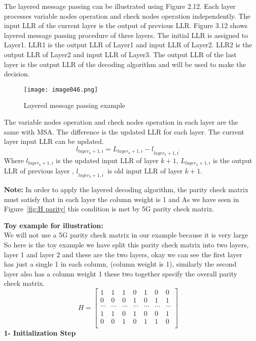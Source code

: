 The layered message passing can be illustrated using Figure 2.12. Each layer processes variable nodes operation and check nodes operation independently. The input LLR of the current layer is the output of previous LLR. Figure 3.12 shows layered message passing procedure of three layers. The initial LLR is assigned to Layer1. LLR1 is the output LLR of Layer1 and input LLR of Layer2. LLR2 is the output LLR of Layer2 and input LLR of Layer3. The output LLR of the last layer is the output LLR of the decoding algorithm and will be used to make the decision.
\begin{figure}[ht]
    \centering
    \texttt{[image: image046.png]}
    \caption{Layered message passing example}
    \label{fig:Layered message passing example }
\end{figure}
The variable nodes operation and check nodes operation in each layer are the same with  MSA. The diﬀerence is the updated LLR for each layer. The current layer input LLR can be updated.
\[ l_{layer_k+1,i}=L_{layer_k+1,i}-l_{layer_k+1,i^\prime} \]
Where $l_{layer_k+1,i}$ is the updated input LLR of layer $k+1$, $L_{layer_k+1,i}$ is the output LLR of previous layer , $l_{layer_k+1,i^\prime}$ is old input LLR of layer $k+1$.\\
\begin{GrayBox}
    \textbf{Note:} In order to apply the layered decoding algorithm, the parity check matrix must satisfy that in each layer the column weight is 1 and As we have seen in Figure~\ref{fig:H parity} this condition is met by 5G parity check matrix.
\end{GrayBox}
\textbf{Toy example for illustration:}\\
We will not use a 5G parity check matrix in our example because it is very large So here is the toy example we have split this parity check matrix into two layers, layer 1 and layer 2 and these are the two layers, okay we can see the first layer has just a single 1 in each column, (column weight is 1), similarly the second layer also has a column weight 1 these two together specify the overall parity check matrix.
\[ H=\left[\begin{matrix}1&1&1&0&1&0&0\\0&0&0&1&0&1&1\\\cdots&\cdots&\cdots&\cdots&\cdots&\cdots&\cdots\\1&1&0&1&0&0&1\\0&0&1&0&1&1&0\\\end{matrix}\right] \]
\textbf{1- Initialization Step}\\
